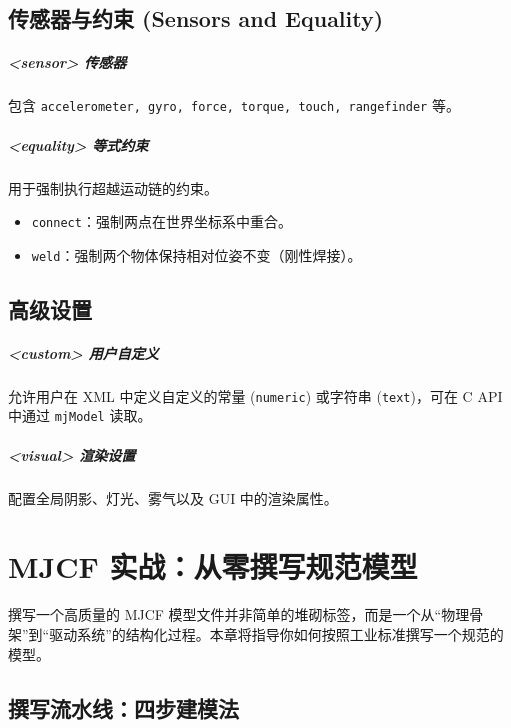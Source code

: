 \documentclass[11pt,a4paper]{book}
\begin{document}
\section{传感器与约束 (Sensors and Equality)}

\paragraph{<sensor> 传感器}
包含 \texttt{accelerometer, gyro, force, torque, touch, rangefinder} 等。

\paragraph{<equality> 等式约束}
用于强制执行超越运动链的约束。
\begin{itemize}
    \item \texttt{connect}：强制两点在世界坐标系中重合。
    \item \texttt{weld}：强制两个物体保持相对位姿不变（刚性焊接）。
\end{itemize}

\section{高级设置}

\paragraph{<custom> 用户自定义}
允许用户在 XML 中定义自定义的常量 (\texttt{numeric}) 或字符串 (\texttt{text})，可在 C API 中通过 \texttt{mjModel} 读取。

\paragraph{<visual> 渲染设置}
配置全局阴影、灯光、雾气以及 GUI 中的渲染属性。

\chapter{MJCF 实战：从零撰写规范模型}

撰写一个高质量的 MJCF 模型文件并非简单的堆砌标签，而是一个从“物理骨架”到“驱动系统”的结构化过程。本章将指导你如何按照工业标准撰写一个规范的模型。

\section{撰写流水线：四步建模法}
\end{document}
